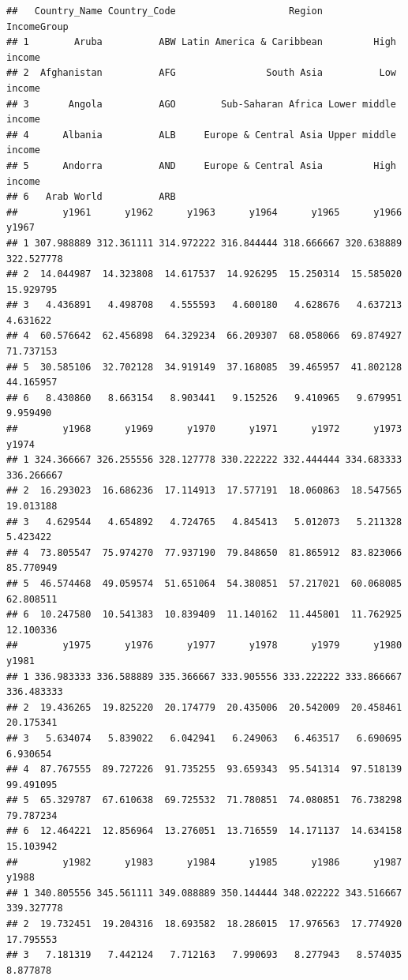 \documentclass[
]{book}
\begin{document}
\begin{verbatim}
##   Country_Name Country_Code                    Region         IncomeGroup
## 1        Aruba          ABW Latin America & Caribbean         High income
## 2  Afghanistan          AFG                South Asia          Low income
## 3       Angola          AGO        Sub-Saharan Africa Lower middle income
## 4      Albania          ALB     Europe & Central Asia Upper middle income
## 5      Andorra          AND     Europe & Central Asia         High income
## 6   Arab World          ARB                                              
##        y1961      y1962      y1963      y1964      y1965      y1966      y1967
## 1 307.988889 312.361111 314.972222 316.844444 318.666667 320.638889 322.527778
## 2  14.044987  14.323808  14.617537  14.926295  15.250314  15.585020  15.929795
## 3   4.436891   4.498708   4.555593   4.600180   4.628676   4.637213   4.631622
## 4  60.576642  62.456898  64.329234  66.209307  68.058066  69.874927  71.737153
## 5  30.585106  32.702128  34.919149  37.168085  39.465957  41.802128  44.165957
## 6   8.430860   8.663154   8.903441   9.152526   9.410965   9.679951   9.959490
##        y1968      y1969      y1970      y1971      y1972      y1973      y1974
## 1 324.366667 326.255556 328.127778 330.222222 332.444444 334.683333 336.266667
## 2  16.293023  16.686236  17.114913  17.577191  18.060863  18.547565  19.013188
## 3   4.629544   4.654892   4.724765   4.845413   5.012073   5.211328   5.423422
## 4  73.805547  75.974270  77.937190  79.848650  81.865912  83.823066  85.770949
## 5  46.574468  49.059574  51.651064  54.380851  57.217021  60.068085  62.808511
## 6  10.247580  10.541383  10.839409  11.140162  11.445801  11.762925  12.100336
##        y1975      y1976      y1977      y1978      y1979      y1980      y1981
## 1 336.983333 336.588889 335.366667 333.905556 333.222222 333.866667 336.483333
## 2  19.436265  19.825220  20.174779  20.435006  20.542009  20.458461  20.175341
## 3   5.634074   5.839022   6.042941   6.249063   6.463517   6.690695   6.930654
## 4  87.767555  89.727226  91.735255  93.659343  95.541314  97.518139  99.491095
## 5  65.329787  67.610638  69.725532  71.780851  74.080851  76.738298  79.787234
## 6  12.464221  12.856964  13.276051  13.716559  14.171137  14.634158  15.103942
##        y1982      y1983      y1984      y1985      y1986      y1987      y1988
## 1 340.805556 345.561111 349.088889 350.144444 348.022222 343.516667 339.327778
## 2  19.732451  19.204316  18.693582  18.286015  17.976563  17.774920  17.795553
## 3   7.181319   7.442124   7.712163   7.990693   8.277943   8.574035   8.877878

\end{verbatim}
\end{document}
